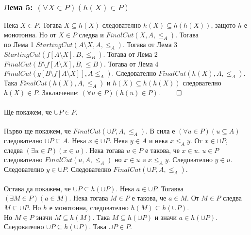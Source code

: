 \documentclass[12pt]{article}
\begin{document}
\subsubsection*{Лема 5: \((\forall X \in P)(h(X) \in P)\)}
Нека \(X \in P\). Тогава \(X \subseteq h(X)\) следователно \(h(X) \subseteq h(h(X))\), защото \(h\) е монотонна.
Но от \(X \in P\) следва и \(FinalCut(X, A, \leq_A)\). Тогава
\\
по Лема 1 \(StartingCut(A \setminus X, A, \leq_A)\).
Тогава от Лема 3
\\
\(StartingCut(f[A \setminus X], B, \leq_B)\).
Тогава от Лема 2
\\
\(FinalCut(B \setminus f[A \setminus X], B, \leq B)\).
Тогава от Лема 4
\\
\(FinalCut(g[B \setminus f[A \setminus X]], A \leq_A)\).
Следователно \(FinalCut(h(X), A, \leq_A)\).
Така \(FinalCut(h(X), A, \leq_A)\) и \(h(X) \subseteq h(h(X))\)
следователно \(h(X) \in P\).
Заключение: \((\forall u \in P)(h(u) \in P)\). \(\qed\)
\\
\vspace{1mm}
\\
Ще покажем, че \(\cup P \in P\).
\\
\vspace{1mm}
\\
Първо ще покажем, че \(FinalCut(\cup P, A, \leq_A)\).
В сила е \((\forall u \in P)(u \subseteq A)\) следователно \(\cup P \subseteq A\).
Нека \(x \in \cup P\). Нека \(y \in A\) и нека \(x \leq_A y\).
От \(x \in \cup P\), следва \((\exists u \in P)(x \in u)\).
Нека тогава \(u \in P\) е такова, че \(x \in u\).
\(u \in P\) следователно \(FinalCut(u, A, \leq_A)\)
но \(x \in u\) и \(x \leq_A y\).
Следователно \(y \in u\).
Следователно \(y \in \cup P\).
Следователно \(FinalCut(\cup P, A, \leq_A)\).
\\
\vspace{1mm}
\\
Остава да покажем, че \(\cup P \subseteq h(\cup P)\).
Нека \(a \in \cup P\). Тогавва
\\
\((\exists M \in P)(a \in M)\).
Нека тогава \(M \in P\) е такова, че \(a \in M\).
От \(M \in P\) следва \(M \subseteq \cup P\).
Но \(h\) е монотонна, следователно \(h(M) \subseteq h(\cup P)\).
\\
Но \(M \in P\) значи \(M \subseteq h(M)\).
Така \(M \subseteq h(\cup P)\) и значи \(a \in h(\cup P)\).
Следователно \(\cup P \subseteq h(\cup P)\).
Така \(\cup P \in P\).
\\
\vspace{1mm}
\end{document}
